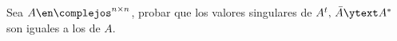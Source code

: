 \begin{enunciado}{\ejercicio}
  Sea $A \en \complejos^{n \times n}$, probar que los valores singulares de $A^t,\, \bar{A} \ytext A^*$ son
  iguales a los de $A$.
\end{enunciado}
\hacer
